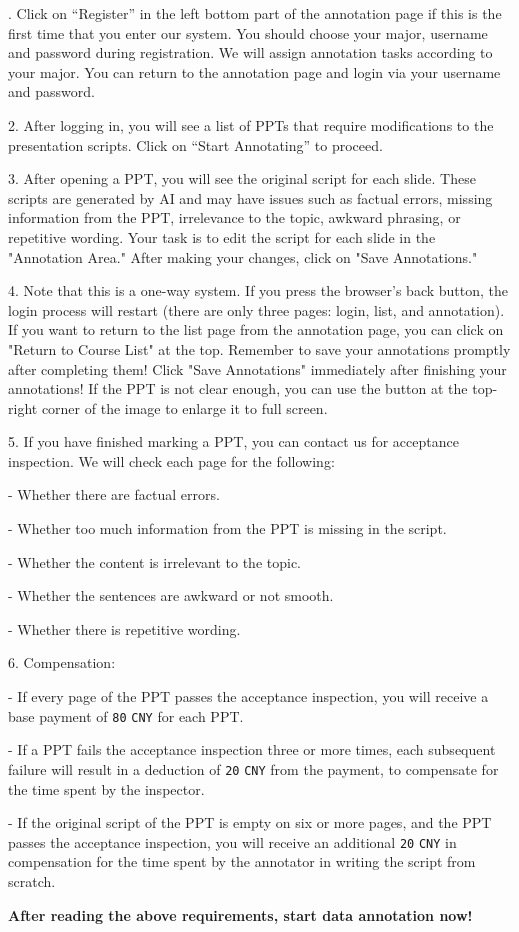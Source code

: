 \begin{tcolorbox}[size=title,opacityfill=0.05,breakable]
. Click on ``Register'' in the left bottom part of the annotation page if this is the first time that you enter our system. You should choose your major, username and password during registration. We will assign annotation tasks according to your major. You can return to the annotation page and login via your username and password.

2. After logging in, you will see a list of PPTs that require modifications to the presentation scripts. Click on “Start Annotating” to proceed.

3. After opening a PPT, you will see the original script for each slide. These scripts are generated by AI and may have issues such as factual errors, missing information from the PPT, irrelevance to the topic, awkward phrasing, or repetitive wording. Your task is to edit the script for each slide in the "Annotation Area." After making your changes, click on "Save Annotations."

4. Note that this is a one-way system. If you press the browser's back button, the login process will restart (there are only three pages: login, list, and annotation). If you want to return to the list page from the annotation page, you can click on "Return to Course List" at the top. Remember to save your annotations promptly after completing them! Click "Save Annotations" immediately after finishing your annotations! If the PPT is not clear enough, you can use the button at the top-right corner of the image to enlarge it to full screen.

5. If you have finished marking a PPT, you can contact us for acceptance inspection. We will check each page for the following:

- Whether there are factual errors.

- Whether too much information from the PPT is missing in the script.

- Whether the content is irrelevant to the topic.

- Whether the sentences are awkward or not smooth.

- Whether there is repetitive wording.

6. Compensation:

- If every page of the PPT passes the acceptance inspection, you will receive a base payment of \texttt{80} \texttt{CNY} for each PPT.

- If a PPT fails the acceptance inspection three or more times, each subsequent failure will result in a deduction of \texttt{20} \texttt{CNY} from the payment, to compensate for the time spent by the inspector.

- If the original script of the PPT is empty on six or more pages, and the PPT passes the acceptance inspection, you will receive an additional \texttt{20} \texttt{CNY} in compensation for the time spent by the annotator in writing the script from scratch.

\textbf{After reading the above requirements, start data annotation now!}

\end{tcolorbox}

